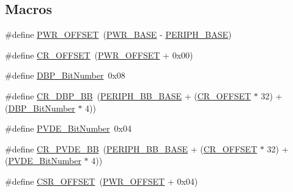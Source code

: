 \subsection*{Macros}
\begin{DoxyCompactItemize}
\item 
\#define \hyperlink{group___p_w_r___private___defines_ga7f88bce73931300319824f22578f90de}{P\+W\+R\+\_\+\+O\+F\+F\+S\+ET}~(\hyperlink{group___peripheral__memory__map_gac691ec23dace8b7a649a25acb110217a}{P\+W\+R\+\_\+\+B\+A\+SE} -\/ \hyperlink{group___peripheral__memory__map_ga9171f49478fa86d932f89e78e73b88b0}{P\+E\+R\+I\+P\+H\+\_\+\+B\+A\+SE})
\item 
\#define \hyperlink{group___p_w_r___private___defines_gafa1d3d0ea72132df651c76fc1bdffffc}{C\+R\+\_\+\+O\+F\+F\+S\+ET}~(\hyperlink{group___p_w_r___private___defines_ga7f88bce73931300319824f22578f90de}{P\+W\+R\+\_\+\+O\+F\+F\+S\+ET} + 0x00)
\item 
\#define \hyperlink{group___p_w_r___private___defines_ga36ff45d972bf94f31f172fd53cf44d23}{D\+B\+P\+\_\+\+Bit\+Number}~0x08
\item 
\#define \hyperlink{group___p_w_r___private___defines_ga799ab60bdbcfc1076cf2d7f206d09b0c}{C\+R\+\_\+\+D\+B\+P\+\_\+\+BB}~(\hyperlink{group___peripheral__memory__map_gaed7efc100877000845c236ccdc9e144a}{P\+E\+R\+I\+P\+H\+\_\+\+B\+B\+\_\+\+B\+A\+SE} + (\hyperlink{group___r_c_c___private___defines_gafa1d3d0ea72132df651c76fc1bdffffc}{C\+R\+\_\+\+O\+F\+F\+S\+ET} $\ast$ 32) + (\hyperlink{group___p_w_r___private___defines_ga36ff45d972bf94f31f172fd53cf44d23}{D\+B\+P\+\_\+\+Bit\+Number} $\ast$ 4))
\item 
\#define \hyperlink{group___p_w_r___private___defines_ga17d618eb800c401ef9c6789c9374eaf8}{P\+V\+D\+E\+\_\+\+Bit\+Number}~0x04
\item 
\#define \hyperlink{group___p_w_r___private___defines_ga49f51ef8285a6be76fd204d49a00709c}{C\+R\+\_\+\+P\+V\+D\+E\+\_\+\+BB}~(\hyperlink{group___peripheral__memory__map_gaed7efc100877000845c236ccdc9e144a}{P\+E\+R\+I\+P\+H\+\_\+\+B\+B\+\_\+\+B\+A\+SE} + (\hyperlink{group___r_c_c___private___defines_gafa1d3d0ea72132df651c76fc1bdffffc}{C\+R\+\_\+\+O\+F\+F\+S\+ET} $\ast$ 32) + (\hyperlink{group___p_w_r___private___defines_ga17d618eb800c401ef9c6789c9374eaf8}{P\+V\+D\+E\+\_\+\+Bit\+Number} $\ast$ 4))
\item 
\#define \hyperlink{group___p_w_r___private___defines_ga984cbe73312b6d3d355c5053763d499a}{C\+S\+R\+\_\+\+O\+F\+F\+S\+ET}~(\hyperlink{group___p_w_r___private___defines_ga7f88bce73931300319824f22578f90de}{P\+W\+R\+\_\+\+O\+F\+F\+S\+ET} + 0x04)

\end{DoxyCompactItemize}
